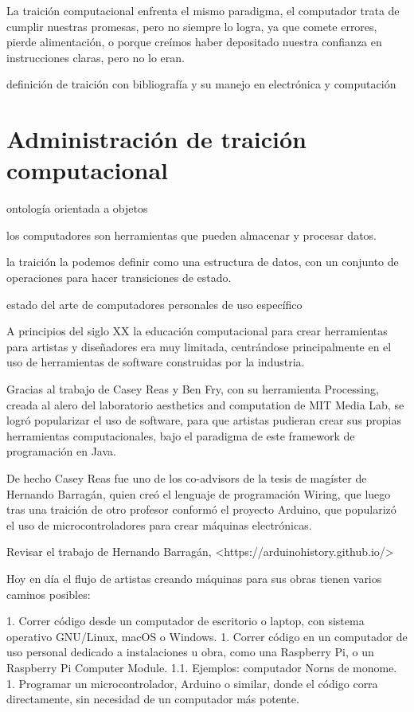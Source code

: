 \documentclass{article}
\begin{document}
La traición computacional enfrenta el mismo paradigma, el computador trata de cumplir nuestras promesas, pero no siempre lo logra, ya que comete errores, pierde alimentación, o porque creímos haber depositado nuestra confianza en instrucciones claras, pero no lo eran.

definición de traición con bibliografía y su manejo en electrónica y computación

\clearpage

\section{Administración de traición computacional}

ontología orientada a objetos

los computadores son herramientas que pueden almacenar y procesar datos.

la traición la podemos definir como una estructura de datos, con un conjunto de operaciones para hacer transiciones de estado.

estado del arte de computadores personales de uso específico

A principios del siglo XX la educación computacional para crear herramientas para artistas y diseñadores era muy limitada, centrándose principalmente en el uso de herramientas de software construidas por la industria.

Gracias al trabajo de Casey Reas y Ben Fry, con su herramienta Processing, creada al alero del laboratorio aesthetics and computation de MIT Media Lab, se logró popularizar el uso de software, para que artistas pudieran crear sus propias herramientas computacionales, bajo el paradigma de este framework de programación en Java.

De hecho Casey Reas fue uno de los co-advisors de la tesis de magíster de Hernando Barragán, quien creó el lenguaje de programación Wiring, que luego tras una traición de otro profesor conformó el proyecto Arduino, que popularizó el uso de microcontroladores para crear máquinas electrónicas.

Revisar el trabajo de Hernando Barragán, <https://arduinohistory.github.io/>

Hoy en día el flujo de artistas creando máquinas para sus obras tienen varios caminos posibles:

1. Correr código desde un computador de escritorio o laptop, con sistema operativo GNU/Linux, macOS o Windows.
1. Correr código en un computador de uso personal dedicado a instalaciones u obra, como una Raspberry Pi, o un Raspberry Pi Computer Module.
  1.1. Ejemplos: computador Norns de monome.
1. Programar un microcontrolador, Arduino o similar, donde el código corra directamente, sin necesidad de un computador más potente.
\end{document}
